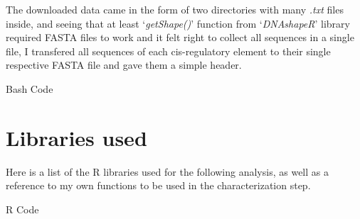 \documentclass[
  letterpaper,
  DIV=11,
  numbers=noendperiod]{scrartcl}
\newenvironment{Shaded}{\begin{snugshade}}{\end{snugshade}}
\newcommand{\BuiltInTok}[1]{\textcolor[rgb]{0.00,0.23,0.31}{#1}}
\newcommand{\DataTypeTok}[1]{\textcolor[rgb]{0.68,0.00,0.00}{#1}}
\newcommand{\FunctionTok}[1]{\textcolor[rgb]{0.28,0.35,0.67}{#1}}
\newcommand{\NormalTok}[1]{\textcolor[rgb]{0.00,0.23,0.31}{#1}}
\newcommand{\OperatorTok}[1]{\textcolor[rgb]{0.37,0.37,0.37}{#1}}
\newcommand{\PreprocessorTok}[1]{\textcolor[rgb]{0.68,0.00,0.00}{#1}}
\newcommand{\StringTok}[1]{\textcolor[rgb]{0.13,0.47,0.30}{#1}}
\begin{document}
The downloaded data came in the form of two directories with many
\emph{.txt} files inside, and seeing that at least `\emph{getShape()}'
function from `\emph{DNAshapeR}' library required FASTA files to work
and it felt right to collect all sequences in a single file, I
transfered all sequences of each cis-regulatory element to their single
respective FASTA file and gave them a simple header.

\begin{bashheader}
Bash Code
\end{bashheader}

\begin{Shaded}
\end{Shaded}

\section{Libraries used}\label{libraries-used}

Here is a list of the R libraries used for the following analysis, as
well as a reference to my own functions to be used in the
characterization step.

\begin{rheader}
R Code
\end{rheader}
\end{document}
